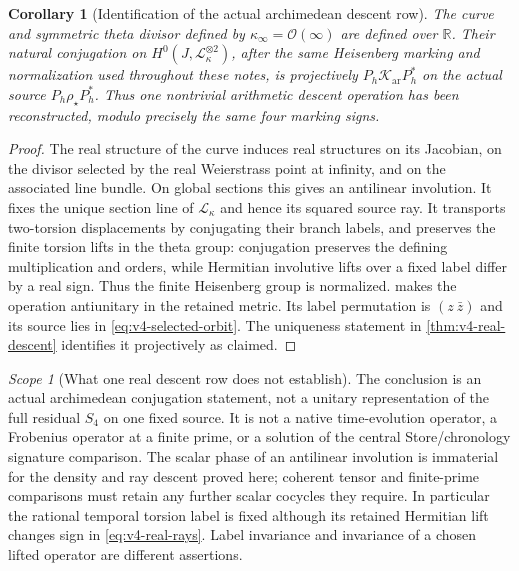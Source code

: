 \documentclass[11pt]{article}
\newtheorem{corollary}[corollary]{Corollary}
\theoremstyle{definition}
\theoremstyle{remark}
\newtheorem{scope}[scope]{Scope}
\newcommand{\R}{\mathbb R}
\begin{document}
\begin{corollary}[Identification of the actual archimedean descent row]
\label{cor:v4-actual-real-descent}
The curve and symmetric theta divisor defined by
$\kappa_\infty=\mathcal O(\infty)$ are defined over $\R$. Their natural
conjugation on $H^0(J,\mathcal L_\kappa^{\otimes2})$, after the same
Heisenberg marking and normalization used throughout these notes, is
projectively $P_h\mathcal K_{\mathrm{ar}}P_h^*$ on the actual source
$P_h\rho_\star P_h^*$. Thus one nontrivial arithmetic descent operation
has been reconstructed, modulo precisely the same four marking signs.
\end{corollary}
\begin{proof}
The real structure of the curve induces real structures on its Jacobian,
on the divisor selected by the real Weierstrass point at infinity, and on
the associated line bundle. On global sections this gives an antilinear
involution. It fixes the unique section line of $\mathcal L_\kappa$ and
hence its squared source ray. It transports two-torsion displacements by
conjugating their branch labels, and preserves the finite torsion lifts
in the theta group: conjugation preserves the defining multiplication and
orders, while Hermitian involutive lifts over a fixed label differ by a
real sign. Thus the finite Heisenberg group is normalized.
 makes the operation antiunitary in the retained
metric. Its label permutation is $(z\ \bar z)$ and its source lies in
\eqref{eq:v4-selected-orbit}. The uniqueness statement in
\cref{thm:v4-real-descent} identifies it projectively as claimed.
\end{proof}

\begin{scope}[What one real descent row does not establish]
The conclusion is an actual archimedean conjugation statement, not a
unitary representation of the full residual $S_4$ on one fixed source.
It is not a native time-evolution operator, a Frobenius operator at a finite
prime, or a solution of the central Store/chronology signature comparison.
The scalar phase of an antilinear involution is immaterial for the density
and ray descent proved here; coherent tensor and finite-prime comparisons
must retain any further scalar cocycles they require. In particular the
rational temporal torsion label is fixed although its retained Hermitian
lift changes sign in \eqref{eq:v4-real-rays}. Label invariance and invariance
of a chosen lifted operator are different assertions.
\end{scope}
\end{document}
